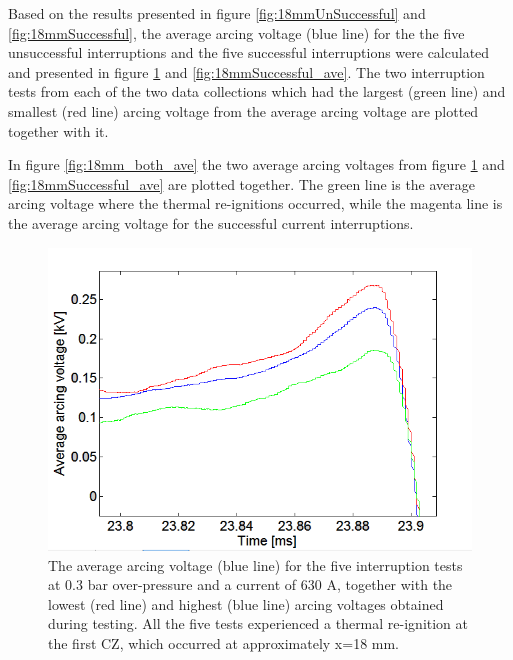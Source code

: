 \documentclass[10pt,b5paper,twoside]{article}
\begin{document}
Based on the results presented in figure \ref{fig:18mmUnSuccessful} and \ref{fig:18mmSuccessful}, the average arcing voltage (blue line) for the the five unsuccessful interruptions and the five successful interruptions were calculated and presented in figure \ref{fig:18mmUnSuccessful_ave} and \ref{fig:18mmSuccessful_ave}. The two interruption tests from each of the two data collections which had the largest (green line) and smallest (red line) arcing voltage from the average arcing voltage are plotted together with it.


In figure \ref{fig:18mm_both_ave} the two average arcing voltages from figure \ref{fig:18mmUnSuccessful_ave} and \ref{fig:18mmSuccessful_ave} are plotted together. The green line is the average arcing voltage where the thermal re-ignitions occurred, while the magenta line is the average arcing voltage for the successful current interruptions.

\begin{figure}[H]
\centering
\includegraphics[scale=0.6, angle =0 ]{Bilder/Results/ArcingVoltage_18_reIgnition_average.PNG}
\caption{The average arcing voltage (blue line) for the five interruption tests at 0.3 bar over-pressure and a current of 630 A, together with the lowest (red line) and highest (blue line) arcing voltages obtained during testing. All the five tests experienced a thermal re-ignition at the first CZ, which occurred at approximately  x=18 mm.} \label{fig:18mmUnSuccessful_ave}
\end{figure}
\end{document}

